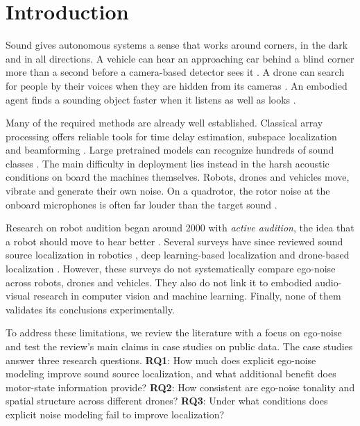 \documentclass{svproc}
\begin{document}
\section{Introduction}\label{sec:intro}
Sound gives autonomous systems a sense that works around corners, in the dark and in all directions.
A vehicle can hear an approaching car behind a blind corner more than a second before a camera-based detector sees it \cite{schulz2021hearing}.
A drone can search for people by their voices when they are hidden from its cameras \cite{deleforge2019spcup,gupta2025droneaudioset}.
An embodied agent finds a sounding object faster when it listens as well as looks \cite{chen2020soundspaces}.

Many of the required methods are already well established.
Classical array processing offers reliable tools for time delay estimation, subspace localization and beamforming \cite{knapp1976gcc,schmidt1986music,capon1969mvdr}.
Large pretrained models can recognize hundreds of sound classes \cite{gemmeke2017audioset,kong2020panns,gong2021ast}.
The main difficulty in deployment lies instead in the harsh acoustic conditions on board the machines themselves.
Robots, drones and vehicles move, vibrate and generate their own noise.
On a quadrotor, the rotor noise at the onboard microphones is often far louder than the target sound \cite{strauss2018dregon,ruizespitia2018aira}.

Research on robot audition began around 2000 with \emph{active audition}, the idea that a robot should move to hear better \cite{nakadai2000active}.
Several surveys have since reviewed sound source localization in robotics \cite{argentieri2015survey,rascon2017review}, deep learning-based localization \cite{grumiaux2022survey} and drone-based localization \cite{chevtchenko2025review}.
However, these surveys do not systematically compare ego-noise across robots, drones and vehicles.
They also do not link it to embodied audio-visual research in computer vision and machine learning.
Finally, none of them validates its conclusions experimentally.

To address these limitations, we review the literature with a focus on ego-noise and test the review's main claims in case studies on public data. The case studies answer three research questions.
\textbf{RQ1}: How much does explicit ego-noise modeling improve sound source localization, and what additional benefit does motor-state information provide?
\textbf{RQ2}: How consistent are ego-noise tonality and spatial structure across different drones?
\textbf{RQ3}: Under what conditions does explicit noise modeling fail to improve localization?
\end{document}
